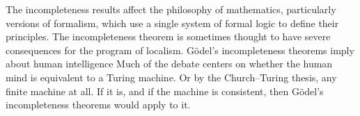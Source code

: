 \documentclass{article}
\begin{document}
The incompleteness results affect the philosophy of mathematics, particularly versions of formalism, which use a single system of formal logic to define their principles. The incompleteness theorem is sometimes thought to have severe consequences for the program of localism. Gödel's incompleteness theorems imply about human intelligence Much of the debate centers on whether the human mind is equivalent to a Turing machine. Or by the Church–Turing thesis, any finite machine at all. If it is, and if the machine is consistent, then Gödel's incompleteness theorems would apply to it.
\end{document}
